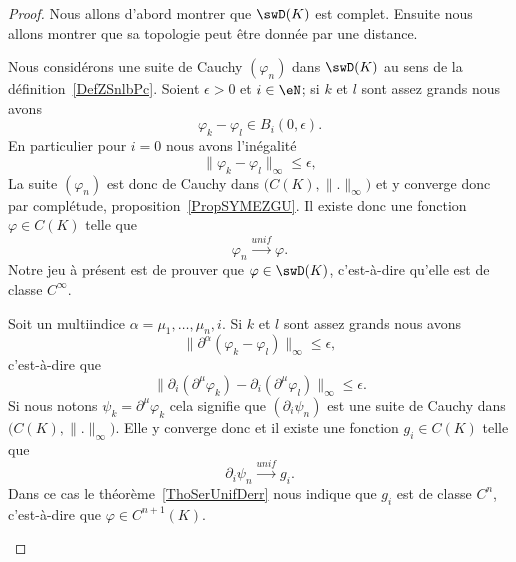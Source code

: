 \begin{proof}

	Nous allons d'abord montrer que \( \swD(K)\) est complet. Ensuite nous allons montrer que sa topologie peut être donnée par une distance.

	\begin{subproof}
		\spitem[Complet]
		Nous considérons une suite de Cauchy \( (\varphi_n)\) dans \( \swD(K)\) au sens de la définition~\ref{DefZSnlbPc}. Soient \( \epsilon>0\) et \( i\in \eN\); si \( k\) et \( l\) sont assez grands nous avons
		\begin{equation}
			\varphi_k-\varphi_l\in B_i(0,\epsilon).
		\end{equation}
		En particulier pour \( i=0\) nous avons l'inégalité
		\begin{equation}
			\| \varphi_k-\varphi_l \|_{\infty}\leq \epsilon,
		\end{equation}
		La suite \( (\varphi_n)\) est donc de Cauchy dans \( \big( C(K),\| . \|_{\infty} \big)\) et y converge donc par complétude, proposition~\ref{PropSYMEZGU}. Il existe donc une fonction \( \varphi\in C(K)\) telle que
		\begin{equation}
			\varphi_n\stackrel{unif}{\longrightarrow}\varphi.
		\end{equation}
		Notre jeu à présent est de prouver que \( \varphi\in\swD(K)\), c'est-à-dire qu'elle est de classe \(  C^{\infty}\).

		Soit un multiindice \( \alpha=\mu_1,\ldots, \mu_n,i\). Si \( k\) et \( l\) sont assez grands nous avons
		\begin{equation}
			\| \partial^{\alpha}(\varphi_k-\varphi_l) \|_{\infty}\leq \epsilon,
		\end{equation}
		c'est-à-dire que
		\begin{equation}
			\| \partial_i(\partial^{\mu}\varphi_k)-\partial_i(\partial^{\mu}\varphi_l) \|_{\infty}\leq \epsilon.
		\end{equation}
		Si nous notons \( \psi_k=\partial^{\mu}\varphi_k\) cela signifie que \( (\partial_i\psi_n)\) est une suite de Cauchy dans \( \big( C(K),\| . \|_{\infty} \big)\). Elle y converge donc et il existe une fonction \( g_i\in C(K)\) telle que
		\begin{equation}
			\partial_i\psi_n\stackrel{unif}{\longrightarrow}g_i.
		\end{equation}
		Dans ce cas le théorème~\ref{ThoSerUnifDerr} nous indique que \( g_i\) est de classe \( C^n\), c'est-à-dire que \( \varphi\in C^{n+1}(K)\).


\end{subproof}
\end{proof}
